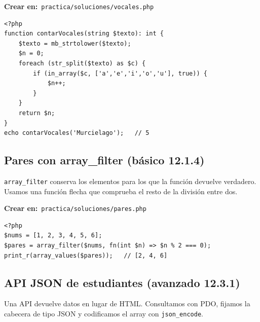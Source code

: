 \documentclass[11pt]{article}
\begin{document}
{\small\color{phpazulo}\textbf{Crear en:}~}\texttt{practica/\allowbreak{}soluciones/\allowbreak{}vocales.\allowbreak{}php}\par\nobreak\vspace{-1pt}
\begin{cajacodigo}
\begin{lstlisting}[style=php]
<?php
function contarVocales(string $texto): int {
    $texto = mb_strtolower($texto);
    $n = 0;
    foreach (str_split($texto) as $c) {
        if (in_array($c, ['a','e','i','o','u'], true)) {
            $n++;
        }
    }
    return $n;
}
echo contarVocales('Murcielago');   // 5
\end{lstlisting}
\end{cajacodigo}
\vspace{2pt}
\subsection{Pares con array\_filter (básico 12.1.4)}
\texttt{array\_filter} conserva los elementos para los que la función devuelve verdadero. Usamos una función flecha que comprueba el resto de la división entre dos.

{\small\color{phpazulo}\textbf{Crear en:}~}\texttt{practica/\allowbreak{}soluciones/\allowbreak{}pares.\allowbreak{}php}\par\nobreak\vspace{-1pt}
\begin{cajacodigo}
\begin{lstlisting}[style=php]
<?php
$nums = [1, 2, 3, 4, 5, 6];
$pares = array_filter($nums, fn(int $n) => $n % 2 === 0);
print_r(array_values($pares));   // [2, 4, 6]
\end{lstlisting}
\end{cajacodigo}
\vspace{2pt}
\subsection{API JSON de estudiantes (avanzado 12.3.1)}
Una API devuelve datos en lugar de HTML. Consultamos con PDO, fijamos la cabecera de tipo JSON y codificamos el array con \texttt{json\_encode}.
\end{document}
